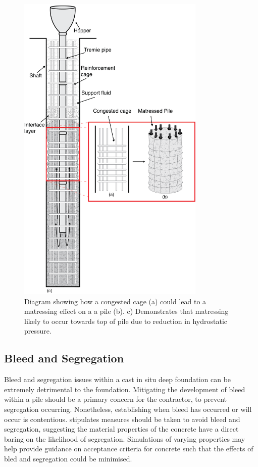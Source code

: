 \begin{figure}[H]
\centering
\includegraphics[width=0.8\textwidth]{matress.png}
\caption{\label{fig:matress}Diagram showing how a congested cage (a) could lead to a matressing effect on a a pile (b). c) Demonstrates that matressing likely to occur towards top of pile due to reduction in hydrostatic pressure.}
\end{figure}

\subsection{Bleed and Segregation}

Bleed and segregation issues within a cast in situ deep foundation can be extremely detrimental to the foundation. Mitigating the development of bleed within a pile should be a primary concern for the contractor, to prevent segregation occurring. Nonetheless, establishing when bleed has occurred or will occur is contentious.  stipulates measures should be taken to avoid bleed and segregation, suggesting the material properties of the concrete have a direct baring on the likelihood of segregation. Simulations of varying properties may help provide guidance on acceptance criteria for concrete such that the effects of bled and segregation could be minimised.









